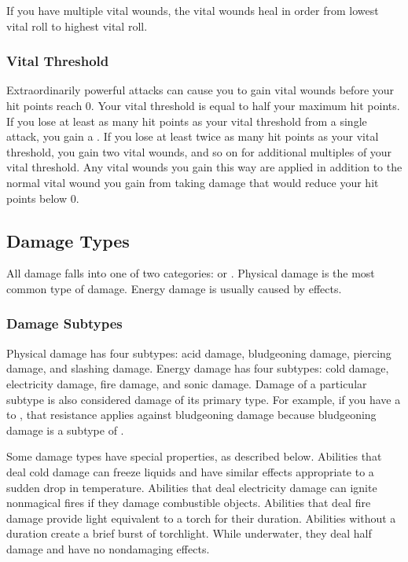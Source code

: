             If you have multiple vital wounds, the vital wounds heal in order from lowest vital roll to highest vital roll.

        \subsubsection{Vital Threshold}\label{Vital Threshold}
            Extraordinarily powerful attacks can cause you to gain vital wounds before your hit points reach 0.
            Your vital threshold is equal to half your maximum hit points.
            If you lose at least as many hit points as your vital threshold from a single attack, you gain a .
            If you lose at least twice as many hit points as your vital threshold, you gain two vital wounds, and so on for additional multiples of your vital threshold.
            Any vital wounds you gain this way are applied in addition to the normal vital wound you gain from taking damage that would reduce your hit points below 0.

    \subsection{Damage Types}\label{Damage Types}
        All damage falls into one of two categories:  or .
        Physical damage is the most common type of damage.
        Energy damage is usually caused by  effects.

        \subsubsection{Damage Subtypes}\label{Damage Subtypes}
            Physical damage has four subtypes: acid damage, bludgeoning damage, piercing damage, and slashing damage.
            Energy damage has four subtypes: cold damage, electricity damage, fire damage, and sonic damage.
            Damage of a particular subtype is also considered damage of its primary type.
            For example, if you have a  to , that resistance applies against bludgeoning damage because bludgeoning damage is a subtype of .

            Some damage types have special properties, as described below.
             Abilities that deal cold damage can freeze liquids and have similar effects appropriate to a sudden drop in temperature.
             Abilities that deal electricity damage can ignite nonmagical fires if they damage combustible objects.
             Abilities that deal fire damage provide light equivalent to a torch for their duration.
            Abilities without a duration create a brief burst of torchlight.
            While underwater, they deal half damage and have no nondamaging effects.

